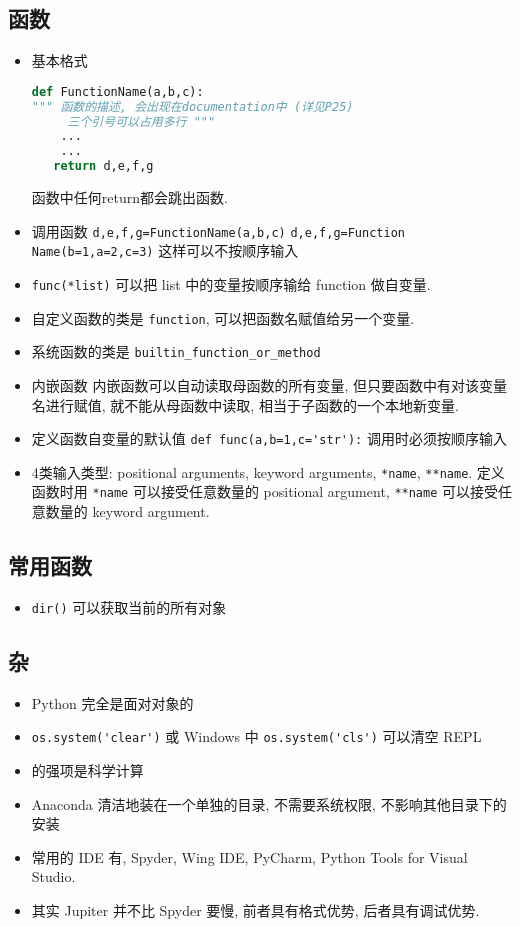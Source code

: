 \subsection{函数}

\begin{itemize}
\item 基本格式
\begin{lstlisting}[language=python]
def FunctionName(a,b,c):
""" 函数的描述, 会出现在documentation中 (详见P25)
     三个引号可以占用多行 """
    ...
    ...
   return d,e,f,g
\end{lstlisting}

函数中任何return都会跳出函数.

\item 调用函数
\verb`d,e,f,g=FunctionName(a,b,c)`
\verb`d,e,f,g=Function Name(b=1,a=2,c=3)`  这样可以不按顺序输入
\item \verb`func(*list)` 可以把 list 中的变量按顺序输给 function 做自变量.

\item 自定义函数的类是 \verb`function`, 可以把函数名赋值给另一个变量.
\item 系统函数的类是 \verb`builtin_function_or_method`

\item 内嵌函数
内嵌函数可以自动读取母函数的所有变量, 但只要函数中有对该变量名进行赋值, 就不能从母函数中读取, 相当于子函数的一个本地新变量.

\item 定义函数自变量的默认值  \verb`def func(a,b=1,c='str'):` 调用时必须按顺序输入
\item 4类输入类型: positional arguments, keyword arguments, \verb`*name`, \verb`**name`. 定义函数时用 \verb`*name` 可以接受任意数量的 positional argument, \verb`**name` 可以接受任意数量的 keyword argument.
\end{itemize}

\subsection{常用函数}
\begin{itemize}
\item \verb`dir()` 可以获取当前的所有对象
\end{itemize}

\subsection{杂}
\begin{itemize}
\item Python 完全是面对对象的
\item \verb`os.system('clear')` 或 Windows 中 \verb`os.system('cls')` 可以清空 REPL
\item {} 的强项是科学计算
\item Anaconda 清洁地装在一个单独的目录, 不需要系统权限, 不影响其他目录下的安装
\item 常用的 IDE 有, Spyder, Wing IDE, PyCharm, Python Tools for Visual Studio.
\item 其实 Jupiter 并不比 Spyder 要慢, 前者具有格式优势, 后者具有调试优势.
\end{itemize}
